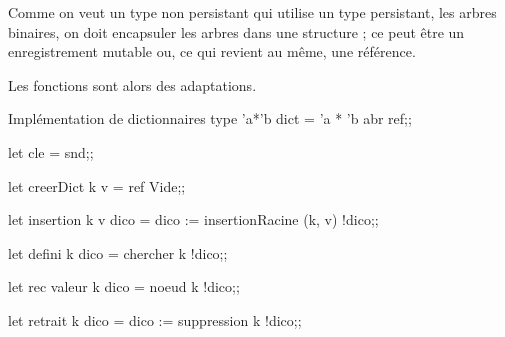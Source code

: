 \begin{figure*}[h]
\centering
{}
\caption{Exemple de dictionnaire}
\end{figure*}

\newpage
Comme on veut un type non persistant qui utilise un type persistant, les arbres binaires, on doit encapsuler les arbres dans une structure ; ce peut être un enregistrement mutable ou, ce qui revient au même, une référence.

Les fonctions sont alors des adaptations.
\begin{code}{Implémentation de dictionnaires}
type 'a*'b dict = 'a * 'b abr ref;;

let cle = snd;;

let creerDict k v = ref Vide;;

let insertion k v dico =
    dico := insertionRacine (k, v) !dico;;
    
let defini k dico
  = chercher k !dico;;
   
let rec valeur k dico = 
  noeud k !dico;;

let retrait k dico = 
  dico := suppression k !dico;;
\end{code}
\newpage
